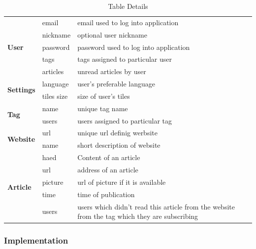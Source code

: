 \documentclass[12pt]{article}
\begin{document}
\begin{table}[H]
\centering
	\begin{tabular}{|p{3cm}|p{3cm}||p{7cm}|} \hline
		\rowcolor{red!20!yellow!30!orange} \multicolumn{3}{|c|}{\textbf{AttomAddict Table Details}} \\ \hline \hline
		\multirow{5}{*}{\textbf{User}} 	 
								&	email	 	& 		email used to log into application		 \\ \cline{2-3}
								&	nickname	& 		optional user nickname						 \\ \cline{2-3}
								&	password	& 		password used to log into application		\\	\cline{2-3}
								& 	tags		&		tags assigned to particular user			\\ 	\cline{2-3}
								&	articles	&		unread articles by user						\\ 	\hline
		\multirow{2}{*}{\textbf{Settings}}
								&	language	&		user's preferable language					\\	\cline{2-3}
								&	tiles size	&		size of user's tiles						\\	\hline
		\multirow{2}{*}{\textbf{Tag}}
								&	name		&		unique tag name								\\ \cline{2-3}
								&	users		&		users assigned to particular tag			\\ \hline
		\multirow{2}{*}{\textbf{Website}}
								&	url			&		unique url definig werbsite					\\	\cline{2-3}
								&	name		&		short description of website				\\ 	\hline
		\multirow{5}{*}{\textbf{Article}}
								&	haed		&		Content of an article						\\	\cline{2-3}
								&	url			&		address of an article						\\	\cline{2-3}
								&	picture		&		url of picture if it is available			\\	\cline{2-3}
								&	time		&		time of publication							\\	\cline{2-3}
								&	users		&		users which didn't read this article from the website from the tag which they are subscribing 			\\ \hline

	\end{tabular}
	\caption{Table Details}
	\label{tab:tableDetails}
\end{table}


\subsubsection{Implementation}
\end{document}
